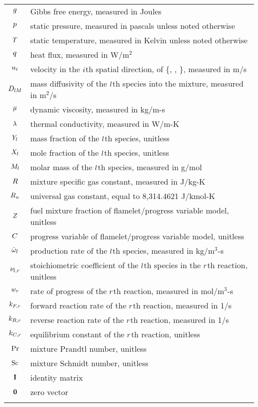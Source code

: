 \begin{longtable}{cp{}}
	$g$ & Gibbs free energy, measured in Joules\\
	$p$ & static pressure, measured in pascals unless noted otherwise \\
	$T$ & static temperature, measured in Kelvin unless noted otherwise \\
	$q$ & heat flux, measured in W/m$^2$ \\
	$u_{i}$ & velocity in the $i$th spatial direction, of \{\velX, \velY, \velZ\}, measured in m/s \\
	$D_{l M}$ & mass diffusivity of the $l$th species into the mixture, measured in m$^2$/s \\
	$\mu$ & dynamic viscosity, measured in kg/m-s \\
	$\lambda$ & thermal conductivity, measured in W/m-K \\
	$Y_{l}$ & mass fraction of the $l$th species, unitless \\
	$X_{l}$ & mole fraction of the $l$th species, unitless \\
	$M_{l}$ & molar mass of the $l$th species, measured in g/mol \\
	$R$ & mixture specific gas constant, measured in J/kg-K \\
	$R_u$ & universal gas constant, equal to 8,314.4621 J/kmol-K \\
	$Z$ & fuel mixture fraction of flamelet/progress variable model, unitless \\
	$C$ & progress variable of flamelet/progress variable model, unitless \\
	$\dot{\omega}_{l}$ & production rate of the $l$th species, measured in kg/m$^3$-s \\
	$\nu_{l,r}$ & stoichiometric coefficient of the $l$th species in the $r$th reaction, unitless \\
	$w_{r}$ & rate of progress of the $r$th reaction, measured in mol/m$^3$-s \\
	$k_{F,r}$ & forward reaction rate of the $r$th reaction, measured in 1/s  \\
	$k_{R,r}$ & reverse reaction rate of the $r$th reaction, measured in 1/s \\
	$k_{C,r}$ & equilibrium constant of the $r$th reaction, unitless \\
	$\text{Pr}$ & mixture Prandtl number, unitless \\
	$\text{Sc}$ & mixture Schmidt number, unitless \\
	$\mathbf{I}$ & identity matrix \\
	$\mathbf{0}$ & zero vector \\
	 &  \\
\end{longtable}